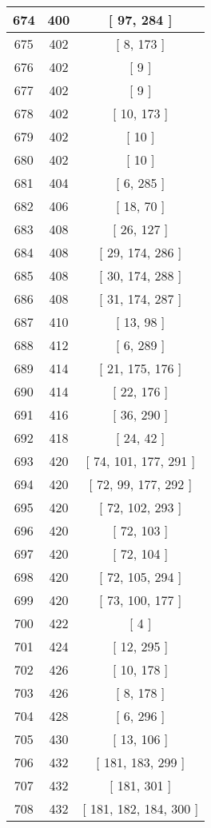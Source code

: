 \begin{center}
\begin{longtable}[H]{|| c c c ||}
\hline
674 & 400 & [ 97, 284 ] \\ 
\hline
675 & 402 & [ 8, 173 ] \\ 
\hline
676 & 402 & [ 9 ] \\ 
\hline
677 & 402 & [ 9 ] \\ 
\hline
678 & 402 & [ 10, 173 ] \\ 
\hline
679 & 402 & [ 10 ] \\ 
\hline
680 & 402 & [ 10 ] \\ 
\hline
681 & 404 & [ 6, 285 ] \\ 
\hline
682 & 406 & [ 18, 70 ] \\ 
\hline
683 & 408 & [ 26, 127 ] \\ 
\hline
684 & 408 & [ 29, 174, 286 ] \\ 
\hline
685 & 408 & [ 30, 174, 288 ] \\ 
\hline
686 & 408 & [ 31, 174, 287 ] \\ 
\hline
687 & 410 & [ 13, 98 ] \\ 
\hline
688 & 412 & [ 6, 289 ] \\ 
\hline
689 & 414 & [ 21, 175, 176 ] \\ 
\hline
690 & 414 & [ 22, 176 ] \\ 
\hline
691 & 416 & [ 36, 290 ] \\ 
\hline
692 & 418 & [ 24, 42 ] \\ 
\hline
693 & 420 & [ 74, 101, 177, 291 ] \\ 
\hline
694 & 420 & [ 72, 99, 177, 292 ] \\ 
\hline
695 & 420 & [ 72, 102, 293 ] \\ 
\hline
696 & 420 & [ 72, 103 ] \\ 
\hline
697 & 420 & [ 72, 104 ] \\ 
\hline
698 & 420 & [ 72, 105, 294 ] \\ 
\hline
699 & 420 & [ 73, 100, 177 ] \\ 
\hline
700 & 422 & [ 4 ] \\ 
\hline
701 & 424 & [ 12, 295 ] \\ 
\hline
702 & 426 & [ 10, 178 ] \\ 
\hline
703 & 426 & [ 8, 178 ] \\ 
\hline
704 & 428 & [ 6, 296 ] \\ 
\hline
705 & 430 & [ 13, 106 ] \\ 
\hline
706 & 432 & [ 181, 183, 299 ] \\ 
\hline
707 & 432 & [ 181, 301 ] \\ 
\hline
708 & 432 & [ 181, 182, 184, 300 ] \\ 

\end{longtable}
\end{center}
